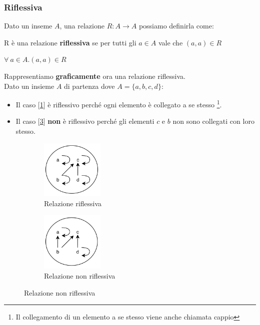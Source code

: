 \subsubsection{Riflessiva}
Dato un inseme $A$, una relazione $R: A \rightarrow A$ possiamo definirla come:
\begin{definition}[Riflessiva]
    R è una relazione \textbf{riflessiva} se per tutti gli $a \in A$ vale che $(a, a) \in R$
    \begin{center}
        $\forall \: a \in A . (a, a) \in R$
    \end{center}
\end{definition}
Rappresentiamo \textbf{graficamente} ora una relazione riflessiva. \\Dato un insieme $A$ di partenza dove $A = \{a, b, c, d\}$:
\begin{itemize}
    \item Il caso [\ref{fig:relazione-riflessiva}] è riflessivo perché ogni elemento è collegato a se stesso \footnote{Il collegamento di un elemento a se stesso viene anche chiamata cappio}.
    \item Il caso [\ref{fig:relazione-non-riflessiva}] \textbf{non} è riflessivo perché gli elementi $c$ e $b$ non sono collegati con loro stesso.
\end{itemize}
\begin{figure}[h!]
    \vspace{-15pt}
    \centering
    \begin{subfigure}{.3\textwidth}
        \centering
        \includegraphics[width=3cm]{images/relazione-riflessiva.png}
        \caption{Relazione riflessiva}
        \label{fig:relazione-riflessiva}
    \end{subfigure}
    \hspace{1.5cm}
    \begin{subfigure}{.3\textwidth}
        \centering
        \includegraphics[width=3cm]{images/relazione-non-riflessiva.png}
        \caption{Relazione non riflessiva}
        \label{fig:relazione-non-riflessiva}
    \end{subfigure}
\end{figure}
